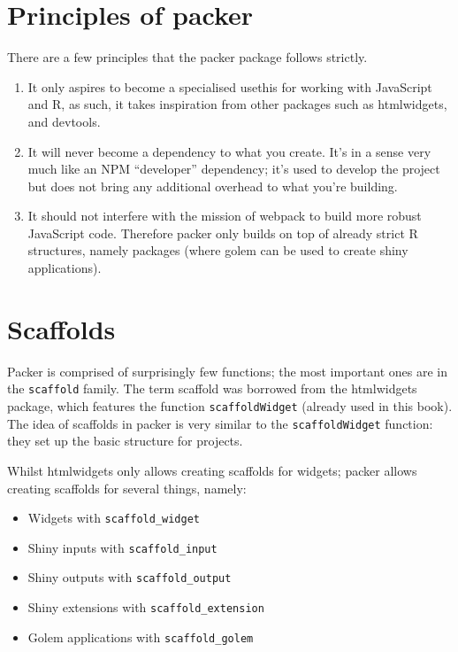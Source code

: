 \documentclass[
]{krantz}
\providecommand{\tightlist}{%
  \setlength{\itemsep}{0pt}\setlength{\parskip}{0pt}}
\begin{document}
\hypertarget{packer-principles}{%
\section{Principles of packer}\label{packer-principles}}

There are a few principles that the packer package follows strictly.

\begin{enumerate}
\def\labelenumi{\arabic{enumi}.}
\tightlist
\item
  It only aspires to become a specialised usethis for working with JavaScript and R, as such, it takes inspiration from other packages such as htmlwidgets, and devtools.
\item
  It will never become a dependency to what you create. It's in a sense very much like an NPM ``developer'' dependency; it's used to develop the project but does not bring any additional overhead to what you're building.
\item
  It should not interfere with the mission of webpack to build more robust JavaScript code. Therefore packer only builds on top of already strict R structures, namely packages (where golem can be used to create shiny applications).
\end{enumerate}

\hypertarget{packer-scaffolds}{%
\section{Scaffolds}\label{packer-scaffolds}}

Packer is comprised of surprisingly few functions; the most important ones are in the \texttt{scaffold} family. The term scaffold was borrowed from the htmlwidgets package, which features the function \texttt{scaffoldWidget} (already used in this book). The idea of scaffolds in packer is very similar to the \texttt{scaffoldWidget} function: they set up the basic structure for projects.

Whilst htmlwidgets only allows creating scaffolds for widgets; packer allows creating scaffolds for several things, namely:

\begin{itemize}
\tightlist
\item
  Widgets with \texttt{scaffold\_widget}
\item
  Shiny inputs with \texttt{scaffold\_input}
\item
  Shiny outputs with \texttt{scaffold\_output}
\item
  Shiny extensions with \texttt{scaffold\_extension}
\item
  Golem applications with \texttt{scaffold\_golem}
\end{itemize}
\end{document}

